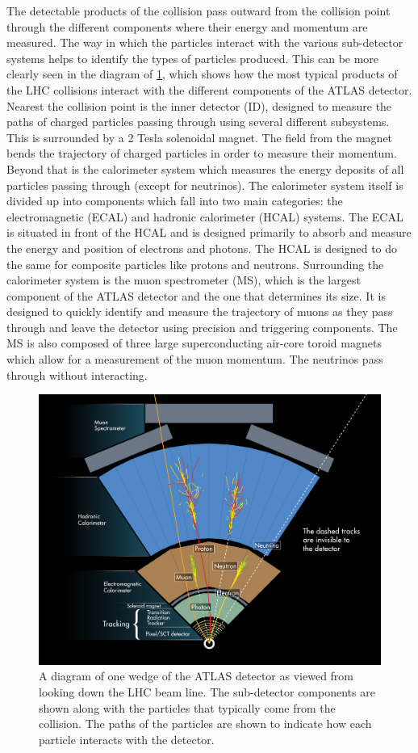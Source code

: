 The detectable products of the collision pass outward from the collision
point through the different components where their energy and momentum
are measured. The way in which the particles interact with the various
sub-detector systems helps to identify the types of 
particles produced.
This can be more clearly seen in the diagram of 
\fig\ref{fig:atlas_wedge}, which shows how the most typical
products of the LHC collisions interact with the different
components of the ATLAS detector.
Nearest the collision point is the inner detector (ID), designed to 
measure the paths of charged particles passing through using several
different subsystems. This 
is surrounded by a 2 Tesla solenoidal magnet.
The field from the magnet bends the trajectory of charged particles
in order to measure their momentum.
Beyond that is the calorimeter system
which measures the energy deposits of all particles passing 
through (except for neutrinos). The calorimeter system 
itself is divided up into components which fall into two main 
categories: the electromagnetic (ECAL)
and hadronic calorimeter (HCAL) systems.
The ECAL is situated in front of the HCAL and is designed
primarily to absorb and measure the energy and position of
electrons and photons. 
The HCAL is designed to do the same for
composite particles like protons and neutrons.
Surrounding the calorimeter system is the muon spectrometer (MS),
which is the largest component of the ATLAS detector and the one
that determines its size. It is designed to quickly identify and measure the 
trajectory of muons as they pass through
and leave the detector using precision 
and triggering components. The MS is also composed of 
three large superconducting air-core toroid magnets 
which allow for
a measurement of the muon momentum. The neutrinos 
pass through without interacting.

\begin{figure}[ht!]
\centering
\includegraphics[width=.9\textwidth]{figures/atlas/wedge.jpg}
\caption{A diagram of one wedge of the ATLAS detector
as viewed from looking down the LHC beam line. 
The sub-detector components are shown along with the 
particles that typically come from the collision.
The paths of the particles are shown to indicate how each particle 
interacts with the detector.}
\label{fig:atlas_wedge}
\end{figure}

